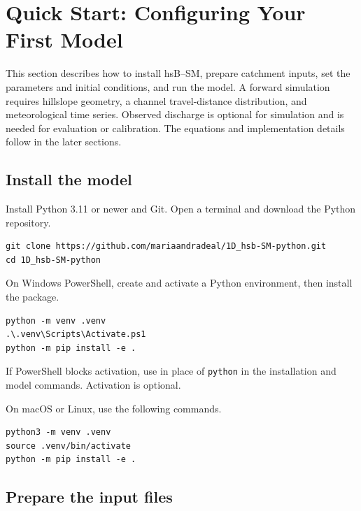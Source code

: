 \section{Quick Start: Configuring Your First Model}
\label{sec:python_quickstart}

This section describes how to install hsB--SM, prepare catchment inputs, set the parameters and initial conditions, and run the model. A forward simulation requires hillslope geometry, a channel travel-distance distribution, and meteorological time series. Observed discharge is optional for simulation and is needed for evaluation or calibration. The equations and implementation details follow in the later sections.

\subsection{Install the model}

Install Python 3.11 or newer and Git. Open a terminal and download the Python repository.

\begin{lstlisting}[language={},caption={Download the repository.}]
git clone https://github.com/mariaandradeal/1D_hsb-SM-python.git
cd 1D_hsb-SM-python
\end{lstlisting}

On Windows PowerShell, create and activate a Python environment, then install the package.

\begin{lstlisting}[language={},caption={Install on Windows.}]
python -m venv .venv
.\.venv\Scripts\Activate.ps1
python -m pip install -e .
\end{lstlisting}

If PowerShell blocks activation, use  in place of \texttt{python} in the installation and model commands. Activation is optional.

On macOS or Linux, use the following commands.

\begin{lstlisting}[language={},caption={Install on macOS or Linux.}]
python3 -m venv .venv
source .venv/bin/activate
python -m pip install -e .
\end{lstlisting}

\subsection{Prepare the input files}

